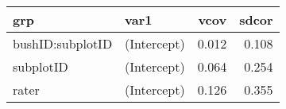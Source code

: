 \begin{table}[ht]
\centering
\begin{tabular}{llrr}
  \hline
grp & var1 & vcov & sdcor \\ 
  \hline
bushID:subplotID & (Intercept) & 0.012 & 0.108 \\ 
  subplotID & (Intercept) & 0.064 & 0.254 \\ 
  rater & (Intercept) & 0.126 & 0.355 \\ 
   \hline
\end{tabular}
\end{table}
